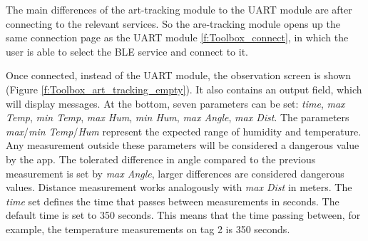 The main differences of the art-tracking module to the UART module are after connecting to the relevant services.
So the are-tracking module opens up the same connection page as the UART module \ref{f:Toolbox_connect}, in which the user is able to select the BLE service and connect to it.

Once connected, instead of the UART module, the observation screen is shown (Figure \ref{f:Toolbox_art_tracking_empty}).
It also contains an output field, which will display messages.
At the bottom, seven parameters can be set: \textit{time}, \textit{max Temp}, \textit{min Temp}, \textit{max Hum}, \textit{min Hum}, \textit{max Angle}, \textit{max Dist}.
The parameters \textit{max}/\textit{min} \textit{Temp}/\textit{Hum} represent the expected range of humidity and temperature.
Any measurement outside these parameters will be considered a dangerous value by the app.
The tolerated difference in angle compared to the previous measurement is set by \textit{max Angle}, larger differences are considered dangerous values.
Distance measurement works analogously with \textit{max Dist} in meters.
The \textit{time} set defines the time that passes between measurements in seconds.
The default time is set to 350 seconds.
This means that the time passing between, for example, the temperature measurements on tag 2 is 350 seconds.


